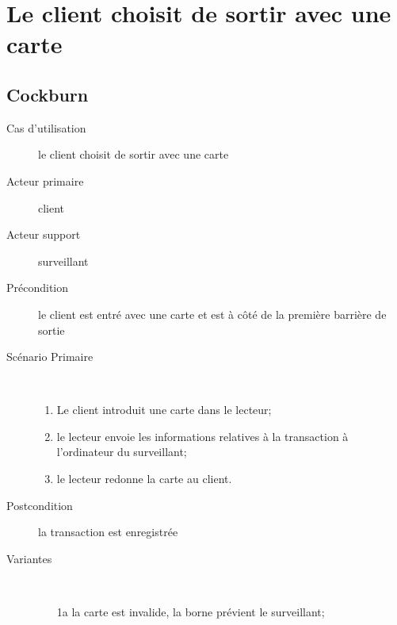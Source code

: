 \documentclass[a4paper]{article}
\begin{document}
\newpage

\section{Le client choisit de sortir avec une carte}
\subsection{Cockburn}
\begin{description}
	\item[Cas d'utilisation] le client choisit de sortir avec une carte
	\item[Acteur primaire] client
	\item[Acteur support] surveillant
	\item[Pr\'econdition] le client est entr\'e avec une carte et est \`a
		c\^ot\'e de la premi\`ere barri\`ere de sortie
	\item[Sc\'enario Primaire] \
	\begin{enumerate}
		\item Le client introduit une carte dans le lecteur;
		\item le lecteur envoie les informations relatives \`a la transaction
			\`a l'ordinateur du surveillant;
		\item le lecteur redonne la carte au client.
	\end{enumerate}
	\item[Postcondition] la transaction est enregistr\'ee
	\item[Variantes] \
	\begin{enumerate}
		\item[1a] la carte est invalide, la borne pr\'evient le surveillant;
	\end{enumerate}
\end{description}
\end{document}
